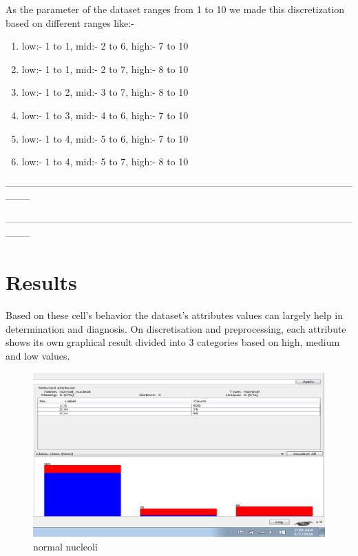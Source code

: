 \documentclass[conference]{IEEEtran}
\begin{document}
As the parameter of the dataset ranges from 1 to 10 we made this discretization based on different ranges like:-

\begin{enumerate}
\item low:- 1 to 1, mid:- 2 to 6, high:- 7 to 10
\item low:- 1 to 1, mid:- 2 to 7, high:- 8 to 10
\item low:- 1 to 2, mid:- 3 to 7, high:- 8 to 10
\item low:- 1 to 3, mid:- 4 to 6, high:- 7 to 10
\item low:- 1 to 4, mid:- 5 to 6, high:- 7 to 10
\item low:- 1 to 4, mid:- 5 to 7, high:- 8 to 10
\end{enumerate}

 --------------------------------------------------------------------------------------------------------------------





 --------------------------------------------------------------------------------------------------------------------
\section{Results}


Based on these cell's behavior the dataset's attributes values can largely help in determination and diagnosis. On discretisation and preprocessing, each attribute shows its own graphical result divided into 3 categories based on high, medium and low values. 

\begin{figure}[!h]
\centering
\includegraphics[scale=0.32]{nucleifig}
\caption{normal nucleoli}
\label{fig_nucle}

\end{figure}
\end{document}

